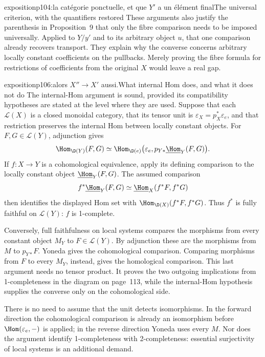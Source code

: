 \begin{dcomment}{exposition}{p104:la catégorie ponctuelle, et que $Y'$ a un élément final}{The universal criterion, with the quantifiers restored}
These arguments also justify the parenthesis in Proposition~9 that only the fibre comparison needs to be imposed universally. Applied to $Y/y'$ and to its arbitrary object $u$, that one comparison already recovers transport. They explain why the converse concerns arbitrary locally constant coefficients on the pullbacks. Merely proving the fibre formula for restrictions of coefficients from the original $X$ would leave a real gap.
\end{dcomment}

\begin{dcomment}{exposition}{p106:alors $X'' \to X'$ aussi.}{What internal Hom does, and what it does not do}
The internal-Hom argument is sound, provided its compatibility hypotheses are stated at the level where they are used. Suppose that each $\mathcal L(X)$ is a closed monoidal category, that its tensor unit is $\varepsilon_X=p_X^*\varepsilon_e$, and that restriction preserves the internal Hom between locally constant objects. For $F,G\in\mathcal L(Y)$, adjunction gives
\[
 \Hom_{\D(Y)}(F,G)
 \simeq\Hom_{\D(e)}\bigl(\varepsilon_e,
                p_{Y*}\underline{\Hom}_Y(F,G)\bigr).
\]
If $f:X\to Y$ is a cohomological equivalence, apply its defining comparison to the locally constant object $\underline{\Hom}_Y(F,G)$. The assumed comparison
\[
 f^*\underline{\Hom}_Y(F,G)
 \simeq\underline{\Hom}_X(f^*F,f^*G)
\]
then identifies the displayed Hom set with $\Hom_{\D(X)}(f^*F,f^*G)$. Thus $f^*$ is fully faithful on $\mathcal L(Y)$: $f$ is 1-complete.

Conversely, full faithfulness on local systems compares the morphisms from every constant object $M_Y$ to $F\in\mathcal L(Y)$. By adjunction these are the morphisms from $M$ to $p_{Y*}F$. Yoneda gives the cohomological comparison. Comparing morphisms from $F$ to every $M_Y$, instead, gives the homological comparison. This last argument needs no tensor product. It proves the two outgoing implications from 1-completeness in the diagram on page~113, while the internal-Hom hypothesis supplies the converse only on the cohomological side.

There is no need to assume that the unit detects isomorphisms. In the forward direction the cohomological comparison is already an isomorphism before $\Hom(\varepsilon_e,-)$ is applied; in the reverse direction Yoneda uses every $M$. Nor does the argument identify 1-completeness with 2-completeness: essential surjectivity of local systems is an additional demand.


\end{dcomment}
